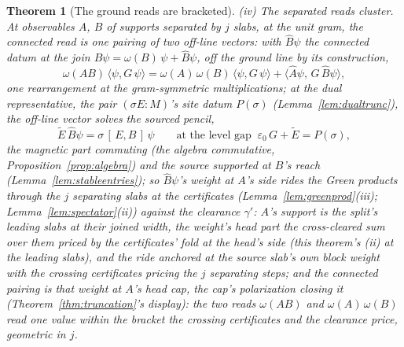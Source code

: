 \documentclass[11pt]{article}
\newtheorem{theorem}{Theorem}
\theoremstyle{definition}
\begin{document}
\begin{theorem}[The ground reads are bracketed]
\emph{(iv) The separated reads cluster.} At observables $A$, $B$
of supports separated by $j$ slabs, at the unit gram, the
connected read is one pairing of two off-line vectors: with
$\hat B\psi$ the connected datum at the join
$B\psi=\omega(B)\,\psi+\hat B\psi$, off the ground line by its
construction,
\[
\omega(AB)\,\langle\psi,G\,\psi\rangle
=\omega(A)\,\omega(B)\,\langle\psi,G\,\psi\rangle
+\langle\hat A\psi,\,G\,\hat B\psi\rangle ,
\]
one rearrangement at the gram-symmetric multiplications; at the
dual representative, the pair $(\sigma E\!:\!M)$'s site datum
$P(\sigma)$
(Lemma~\ref{lem:dualtrunc}), the
off-line vector solves the sourced pencil,
\[
\tilde E\,\hat B\psi
=\sigma\,[\,E,B\,]\,\psi
\qquad\text{at the level gap }\
\varepsilon_0\,G+\tilde E=P(\sigma) ,
\]
the magnetic part commuting (the algebra commutative,
Proposition~\ref{prop:algebra}) and the source supported at $B$'s
reach (Lemma~\ref{lem:stableentries}); so $\hat B\psi$'s weight at
$A$'s side rides the Green products through the $j$ separating
slabs at the certificates (Lemma~\ref{lem:greenprod}(iii);
Lemma~\ref{lem:spectator}(ii)) against the clearance $\gamma'$:
$A$'s support is the split's leading slabs at their joined width,
the weight's head part the cross-cleared sum over them priced by
the certificates' fold at the head's side (this theorem's (ii)
at the leading slabs), and the ride anchored at the source
slab's own block weight with the crossing certificates pricing
the $j$ separating steps; and the connected pairing is that
weight at $A$'s head cap, the
cap's polarization closing it (Theorem~\ref{thm:truncation}'s
display): the two reads $\omega(AB)$ and $\omega(A)\,\omega(B)$
read one value within the bracket the crossing certificates and
the clearance price, geometric in $j$.


\end{theorem}
\end{document}
